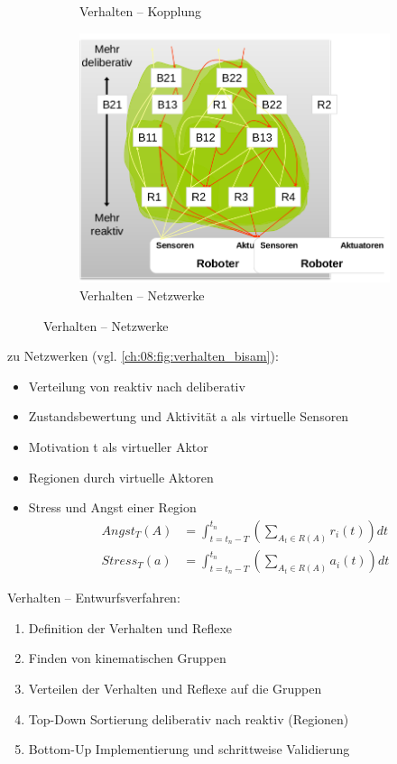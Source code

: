 \begin{figure}
\begin{subfigure}{.5\textwidth}
		\caption{Verhalten -- Kopplung}
	\end{subfigure}
	\begin{subfigure}{.5\textwidth}		
		\centering
		\includegraphics[width=\textwidth]{figures/verhalten_netzwerke.png}
		\caption{Verhalten -- Netzwerke}
	\end{subfigure}
	\label{ch:08:fig:verhalten_bisam}
\end{figure}

zu Netzwerken (vgl. \autoref{ch:08:fig:verhalten_bisam}):
\begin{itemize}
	\item Verteilung von reaktiv nach deliberativ
	\item Zustandsbewertung und Aktivität a als virtuelle Sensoren
	\item Motivation t als virtueller Aktor
	\item Regionen durch virtuelle Aktoren
	\item Stress und Angst einer Region
	\begin{align}	
		Angst_T(A) &= \int_{t = t_n - T}^{t_n} \left( \sum_{A_t \in R(A)} r_i\left(t\right)\right) dt \\
		Stress_T(a) &= \int_{t = t_n - T}^{t_n} \left( \sum_{A_t \in R(A)} a_i\left(t\right)\right) dt
	\end{align}
\end{itemize}

Verhalten -- Entwurfsverfahren:
\begin{enumerate}
	\item Definition der Verhalten und Reflexe
	\item Finden von kinematischen Gruppen
	\item Verteilen der Verhalten und Reflexe auf die Gruppen
	\item Top-Down Sortierung deliberativ nach reaktiv (Regionen)
	\item Bottom-Up Implementierung und schrittweise Validierung
\end{enumerate}

